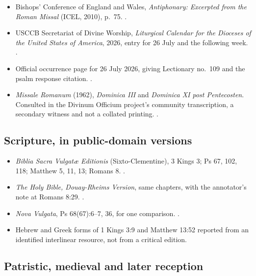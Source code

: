 \begin{itemize}
\item Bishops' Conference of England and Wales, \emph{Antiphonary: Excerpted from the Roman Missal} (ICEL, 2010), p.~75. .
\item USCCB Secretariat of Divine Worship, \emph{Liturgical Calendar for the Dioceses of the United States of America}, 2026, entry for 26 July and the following week. .
\item Official occurrence page for 26 July 2026, giving Lectionary no.~109 and the psalm response citation. .
\item \emph{Missale Romanum} (1962), \emph{Dominica III} and \emph{Dominica XI post Pentecosten}. Consulted in the Divinum Officium project's community transcription, a secondary witness and not a collated printing. .
\end{itemize}

\subsection*{Scripture, in public-domain versions}

\begin{itemize}
\item \emph{Biblia Sacra Vulgat\ae{} Editionis} (Sixto-Clementine), 3 Kings 3; Ps 67, 102, 118; Matthew 5, 11, 13; Romans 8. .
\item \emph{The Holy Bible, Douay-Rheims Version}, same chapters, with the annotator's note at Romans 8:29. .
\item \emph{Nova Vulgata}, Ps 68(67):6--7, 36, for one comparison. .
\item Hebrew and Greek forms of 1 Kings 3:9 and Matthew 13:52 reported from an identified interlinear resource, not from a critical edition.
\end{itemize}

\subsection*{Patristic, medieval and later reception}

